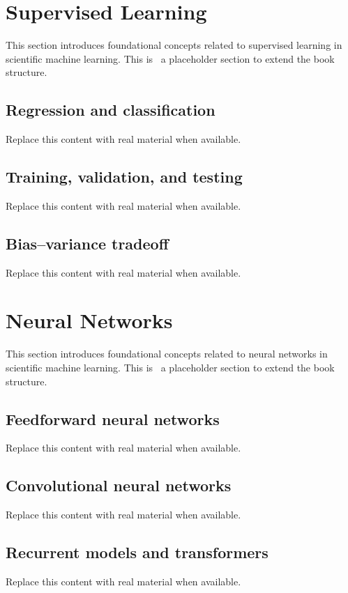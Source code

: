 
\section{Supervised Learning}
This section introduces foundational concepts related to supervised learning in scientific machine learning. This is~\cite{abdulmaksoudTransformerBasedSensorFusion2025} a placeholder section to extend the book structure.

\subsection{Regression and classification}
Replace this content with real material when available.

\subsection{Training, validation, and testing}
Replace this content with real material when available.

\subsection{Bias--variance tradeoff}
Replace this content with real material when available.

\section{Neural Networks}
This section introduces foundational concepts related to neural networks in scientific machine learning. This is~\cite{abdulmaksoudTransformerBasedSensorFusion2025} a placeholder section to extend the book structure.

\subsection{Feedforward neural networks}
Replace this content with real material when available.

\subsection{Convolutional neural networks}
Replace this content with real material when available.

\subsection{Recurrent models and transformers}
Replace this content with real material when available.

